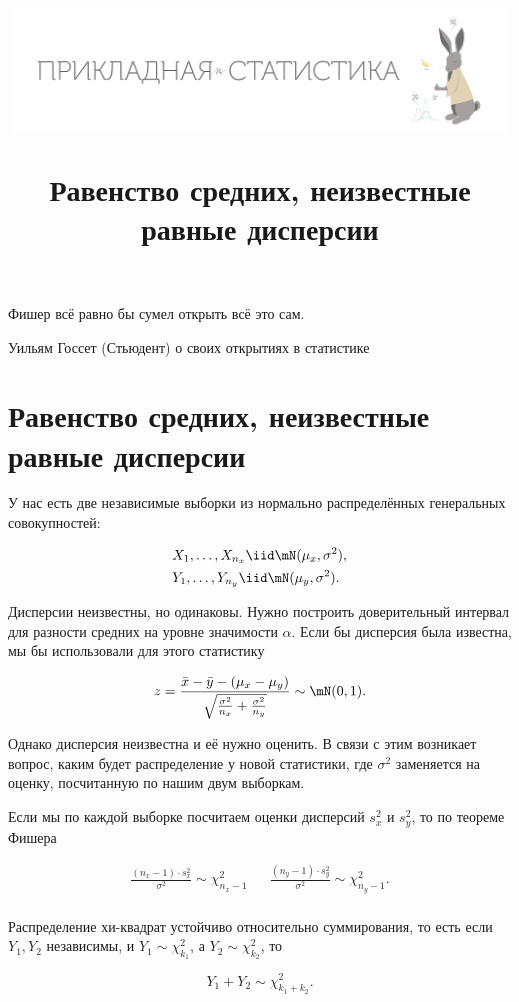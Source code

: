 \documentclass[12pt, a4paper, oneside]{article}
\title{\begin{center} \includegraphics[width=0.99\textwidth]{logo.png} \end{center}Равенство средних, неизвестные равные дисперсии}
\date{ } %
\begin{document}

\maketitle

\epigraph{Фишер всё равно бы сумел открыть всё это сам.}{Уильям Госсет (Стьюдент) о своих открытиях в статистике}


\section*{Равенство средних, неизвестные равные дисперсии}

У нас есть две независимые выборки из нормально распределённых генеральных совокупностей: 

\begin{equation*} 
\begin{aligned} 
& X_1, \ldots, X_{n_x} \iid \mN(\mu_x, \sigma^2), \\  
& Y_1, \ldots, Y_{n_y} \iid \mN(\mu_y, \sigma^2). 
\end{aligned} 
\end{equation*} 

Дисперсии неизвестны, но одинаковы. Нужно построить доверительный интервал для разности средних на уровне значимости $\alpha$. Если бы дисперсия была известна, мы бы использовали для этого статистику 

$$
z = \frac{\bar{x} - \bar{y} - (\mu_x - \mu_y)}{\sqrt{\frac{\sigma^2}{n_x} + \frac{\sigma^2}{n_y}}} \sim \mN(0,1).
$$

Однако дисперсия неизвестна и её нужно оценить. В связи с этим возникает вопрос, каким будет распределение у новой статистики, где $\sigma^2$ заменяется на оценку, посчитанную по нашим двум выборкам. 

Если мы по каждой выборке посчитаем оценки дисперсий $s^2_x$ и $s^2_y$, то по теореме Фишера 

\begin{align*} 
\frac{(n_x - 1) \cdot s_x^2}{\sigma^2} \sim \chi^2_{n_x - 1} & & \frac{(n_y - 1) \cdot s_y^2}{\sigma^2} \sim \chi^2_{n_y - 1}. \\
\end{align*}

Распределение хи-квадрат устойчиво относительно суммирования, то есть если  $Y_1, Y_2$ независимы, и $Y_1 \sim \chi^2_{k_1}$, а $Y_2 \sim \chi^2_{k_2}$, то

$$ 
Y_1 + Y_2 \sim \chi^2_{k_1 + k_2}.
$$
\end{document}
